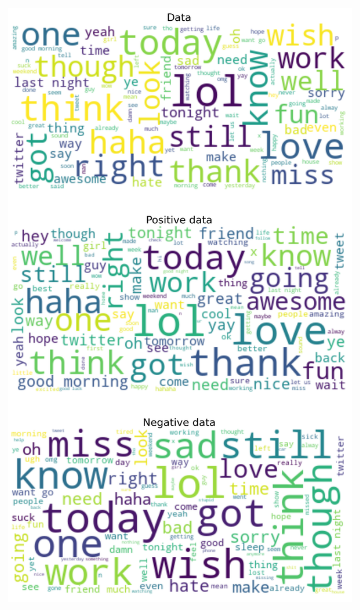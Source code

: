 \documentclass{article}
\begin{document}
\begin{itemize}
\begin{figure}[H]
\begin{subfigure}[b]{0.24\textwidth}
\includegraphics[width=\textwidth]{chapter-06/section-01-01/01/visualization/3/wordcloud.png}
\end{subfigure}
\begin{subfigure}[b]{0.24\textwidth}
\centering

\end{subfigure}
\end{figure}
\end{itemize}
\end{document}
